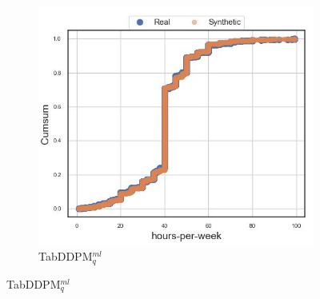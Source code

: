 \begin{figure}[H]
	\begin{subfigure}{0.32\textwidth}
		\centering
		\includegraphics[width=\textwidth]{images/cdf_hpw/tab-ddpm.jpg}
		\caption{TabDDPM$^{ml}_q$}
	\end{subfigure}



\end{figure}
